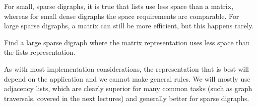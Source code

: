For small, sparse digraphs,
it is true that lists use less space than a matrix, whereas for small
dense digraphs the space requirements are comparable. For large sparse
digraphs, a matrix can still be more efficient, but this happens rarely.

\begin{Boxample}[2]
Find a large sparse digraph where the matrix representation uses less space than the lists representation.
\end{Boxample}

As with most implementation considerations, the representation that is best will depend on the application and we cannot make general rules.  We will mostly use adjacency lists, which are
clearly superior for many common tasks (such as graph traversals, covered
in the next lectures) and generally better for sparse digraphs.


%

